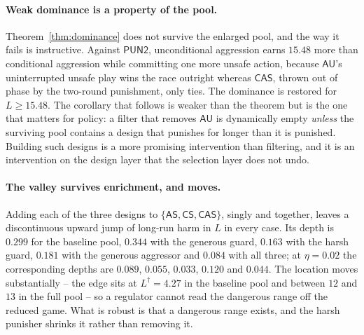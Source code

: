 \documentclass[11pt,a4paper]{article}
\theoremstyle{definition}
\newcommand{\AS}{\textsf{AS}}
\newcommand{\AU}{\textsf{AU}}
\newcommand{\CS}{\textsf{CS}}
\newcommand{\CAS}{\textsf{CAS}}
\begin{document}
\paragraph{Weak dominance is a property of the pool.}
Theorem~\ref{thm:dominance} does not survive the enlarged pool, and the way it
fails is instructive. Against $\mathsf{PUN2}$, unconditional aggression earns
$15.48$ more than conditional aggression while committing one more unsafe
action, because $\AU$'s uninterrupted unsafe play wins the race outright
whereas $\CAS$, thrown out of phase by the two-round punishment, only ties.
The dominance is restored for $L\ge 15.48$. The corollary that follows is
weaker than the theorem but is the one that matters for policy: a filter that
removes $\AU$ is dynamically empty \emph{unless} the surviving pool contains a
design that punishes for longer than it is punished. Building such designs is
a more promising intervention than filtering, and it is an intervention on the
design layer that the selection layer does not undo.

\paragraph{The valley survives enrichment, and moves.}
Adding each of the three designs to $\{\AS,\CS,\CAS\}$, singly and together,
leaves a discontinuous upward jump of long-run harm in $L$ in every case. Its
depth is $0.299$ for the baseline pool, $0.344$ with the generous guard,
$0.163$ with the harsh guard, $0.181$ with the generous aggressor and $0.084$
with all three; at $\eta=0.02$ the corresponding depths are $0.089$, $0.055$,
$0.033$, $0.120$ and $0.044$. The location moves substantially -- the edge
sits at $L^{\dagger}=4.27$ in the baseline pool and between $12$ and $13$ in
the full pool -- so a regulator cannot read the dangerous range off the
reduced game. What is robust is that a dangerous range exists, and the harsh
punisher shrinks it rather than removing it.
\end{document}
